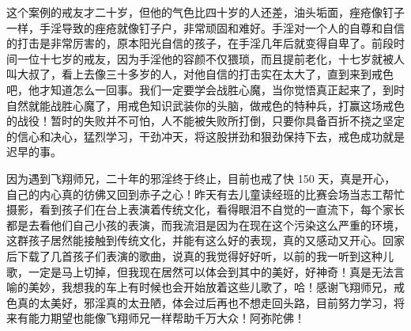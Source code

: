 \begin{case}
    这个案例的戒友才二十岁，但他的气色比四十岁的人还差，油头垢面，痤疮像钉子一样，手淫导致的痤疮就像钉子户，非常顽固和难好。手淫对一个人的自尊和自信的打击是非常厉害的，原本阳光自信的孩子，在手淫几年后就变得自卑了。前段时间一位十七岁的戒友，因为手淫他的容颜不仅猥琐，而且提前老化，十七岁就被人叫大叔了，看上去像三十多岁的人，对他自信的打击实在太大了，直到来到戒色吧，他才知道怎么一回事。我们一定要学会战胜心魔，当你觉悟真正起来了，到时自然就能战胜心魔了，用戒色知识武装你的头脑，做戒色的特种兵，打赢这场戒色的战役！暂时的失败并不可怕，人不能被失败所打倒，只要你具备百折不挠之坚定的信心和决心，猛烈学习，干劲冲天，将这股拼劲和狠劲保持下去，戒色成功就是迟早的事。
\end{case}

\begin{case}
    因为遇到飞翔师兄，二十年的邪淫终于终止，目前也戒了快 150 天，真是开心，自己的内心真的彷佛又回到赤子之心！昨天有去儿童读经班的比赛会场当志工帮忙摄影，看到孩子们在台上表演着传统文化，看得眼泪不自觉的一直流下，每个家长都是去看他们自己小孩的表演，而我流泪是因为在现在这个污染这么严重的环境，这群孩子居然能接触到传统文化，并能有这么好的表现，真的又感动又开心。回家后下载了几首孩子们表演的歌曲，说真的我觉得好好听，以前的我一听到这种儿歌，一定是马上切掉，但我现在居然可以体会到其中的美好，好神奇！真是无法言喻的美妙，我想我的车上有时候也会开始放着这些儿歌了，哈！感谢飞翔师兄，戒色真的太美好，邪淫真的太丑陋，体会过后再也不想走回头路，目前努力学习，将来有能力期望也能像飞翔师兄一样帮助千万大众！阿弥陀佛！


\end{case}
